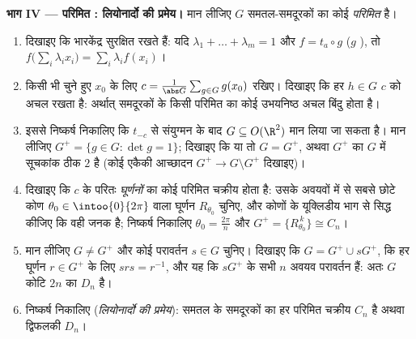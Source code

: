\begin{problem}
\medskip \noindent\textbf{भाग IV --- परिमित : लियोनार्दो की प्रमेय।} मान
लीजिए $G$ समतल-समदूरकों का कोई \emph{परिमित}  है।
\begin{enumerate}[resume]
  \item दिखाइए कि  भारकेंद्र सुरक्षित रखते हैं: यदि $\lambda_1 + \dots
  + \lambda_m = 1$ और $f = t_a \circ g$ ($g$ ), तो $f\bigl(\sum_i
  \lambda_i x_i\bigr) = \sum_i \lambda_i f(x_i)$।
  \item किसी भी चुने हुए $x_0$ के लिए $c = \frac{1}{\abs G}\sum_{g \in G}
  g(x_0)$ रखिए। दिखाइए कि हर $h \in G$ $c$ को अचल रखता है: अर्थात् समदूरकों
  के किसी परिमित  का कोई उभयनिष्ठ अचल बिंदु होता है।
  \item इससे निष्कर्ष निकालिए कि $t_{-c}$ से संयुग्मन के बाद $G \subseteq
  O(\R^2)$ मान लिया जा सकता है। मान लीजिए $G^{+} = \{g \in G : \det g =
  1\}$; दिखाइए कि या तो $G = G^{+}$, अथवा $G^{+}$ का $G$ में सूचकांक ठीक $2$
  है (कोई एकैकी आच्छादन $G^+ \to G \setminus G^+$ दिखाइए)।
  \item दिखाइए कि $c$ के परितः \emph{घूर्णनों} का कोई परिमित  चक्रीय
  होता है: उसके अवयवों में से सबसे छोटे कोण $\theta_0 \in \intoo{0}{2\pi}$
  वाला घूर्णन $R_{\theta_0}$ चुनिए, और कोणों के यूक्लिडीय भाग से सिद्ध कीजिए
  कि वही जनक है; निष्कर्ष निकालिए $\theta_0 = \frac{2\pi}n$ और $G^{+} =
  \{R_{\theta_0}^{\,k}\} \cong C_n$।
  \item मान लीजिए $G \neq G^{+}$ और कोई परावर्तन $s \in G$ चुनिए। दिखाइए कि
  $G = G^{+} \cup sG^{+}$, कि हर घूर्णन $r \in G^{+}$ के लिए $s r s =
  r^{-1}$, और यह कि $sG^{+}$ के सभी $n$ अवयव परावर्तन हैं: अतः $G$ कोटि $2n$
  का \emph{} $D_n$ है।
  \item निष्कर्ष निकालिए (\emph{लियोनार्दो की प्रमेय}): समतल के समदूरकों का
  हर परिमित  चक्रीय $C_n$ है अथवा द्विफलकी $D_n$।
\end{enumerate}


\end{problem}
